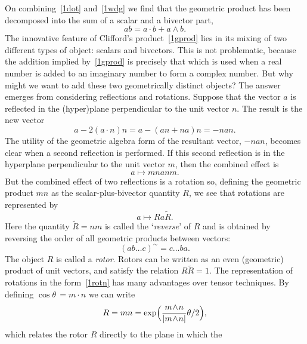 \documentclass[a4paper]{article}
\numberwithin{equation}{section}
\newcommand{\dt}{\! \cdot \!}
\newcommand{\wdg}{\! \wedge \!}
\newcommand{\tld}{\sim}
\newcommand{\eqv}{=}
\newcommand{\Rrev}{\tilde{R}}
\newcommand{\csthet}{\cos\!\theta\,}
\begin{document}
On combining~\eqref{1dot} and~\eqref{1wdg} we find that the geometric product
has been decomposed into the sum of a scalar and a bivector part,
%
\begin{equation}
ab = a \dt b + a \wdg b.
\label{1gprod}
\end{equation}
%
The innovative feature of Clifford's product~\eqref{1gprod} lies in its
mixing of two different types of object: scalars and bivectors.  This
is not problematic, because the addition implied by~\eqref{1gprod} is
precisely that which is used when a real number is added to an
imaginary number to form a complex number.  But why might we want to
add these two geometrically distinct objects?  The answer emerges from
considering reflections and rotations.  Suppose that the vector $a$ is
reflected in the (hyper)plane perpendicular to the unit vector $n$.
The result is the new vector
%
\begin{equation}
a - 2 (a \dt n) n = a -(an + na)n = - nan.
\label{1reflec1} 
\end{equation}
%
The utility of the geometric algebra form of the resultant vector,
$-nan$, becomes clear when a second reflection is performed.  If this
second reflection is in the hyperplane perpendicular to the unit
vector $m$, then the combined effect is
%
\begin{equation}
a \mapsto mnanm.
\end{equation}
%
But the combined effect of two reflections is a rotation so, defining
the geometric product $mn$ as the scalar-plus-bivector quantity $R$,
we see that rotations are represented by
%
\begin{equation}
a \mapsto Ra\Rrev.
\label{1rotn}
\end{equation}
%
Here the quantity $\Rrev=nm$ is called the `{\em reverse}' of $R$ and
is obtained by reversing the order of all geometric products between
vectors:
%
\begin{equation}
(ab \dots c)^\tld \eqv c \dots ba.
\end{equation}
%
The object $R$ is called a {\em rotor\/}.  Rotors can be written as an
even (geometric) product of unit vectors, and satisfy the relation
$R\Rrev=1$.  The representation of rotations in the form~\eqref{1rotn} has
many advantages over tensor techniques.  By defining $\csthet\eqv
m\dt n$ we can write
%
\begin{equation}
R = mn = \exp \Bigl( \frac{m \wdg n}{|m \wdg n|} \theta/2 \Bigr),
\label{O4}
\end{equation}
% 
which relates the rotor $R$ directly to the plane in which the
\end{document}
